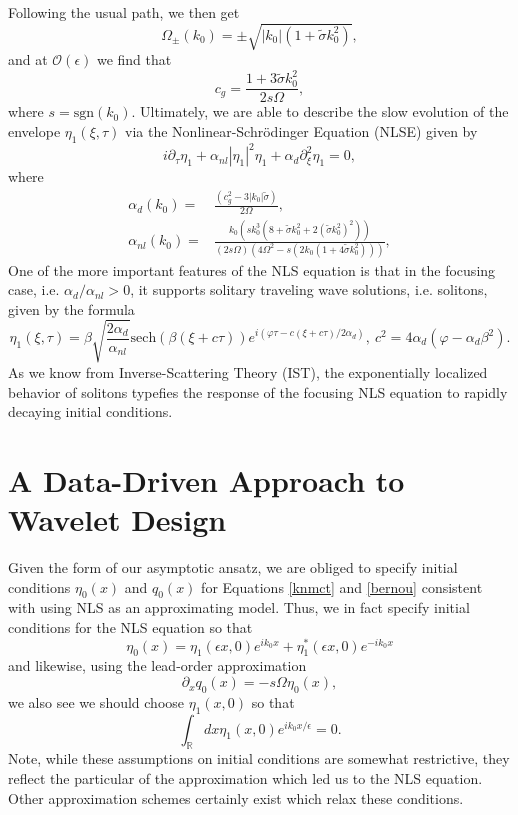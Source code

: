 \documentclass[a4paper,11pt]{article}
\newcommand{\p}{\partial}
\newcommand{\sech}{\mbox{sech}}
\begin{document}
Following the usual path, we then get 
\begin{equation*}
\Omega_{\pm}(k_{0})  = \pm \sqrt{|k_{0}|(1+\tilde{\sigma}k_{0}^{2})},
\end{equation*}
and at $\mathcal{O}(\epsilon)$ we find that
\[
c_{g} = \frac{1+3\tilde{\sigma}k_{0}^{2}}{2s\Omega},
\]
where $s=\mbox{sgn}(k_{0})$.  Ultimately, we are able to describe the slow evolution of the envelope $\eta_{1}(\xi,\tau)$ via the Nonlinear-Schr\"{o}dinger Equation (NLSE) given by 
\begin{equation*}
i\p_{\tau}\eta_{1} + \alpha_{nl}\left|\eta_{1}\right|^{2}\eta_{1} + \alpha_{d}\p_{\xi}^{2}\eta_{1} = 0,
\end{equation*}
where
\begin{align*}
\alpha_{d}(k_{0}) = & \frac{(c^2_{g} - 3|k_{0}|\tilde{\sigma})}{2\Omega},\\
\alpha_{nl}(k_{0}) = & \frac{k_{0}\left( sk_{0}^{3}\left(8 + \tilde{\sigma}k_{0}^{2} + 2(\tilde{\sigma}k_{0}^{2})^{2}\right)  \right)}{\left(2s\Omega \right) \left(4\Omega^2-s(2k_{0}(1+4\tilde{\sigma}k_{0}^{2}) )\right)},
\end{align*}
One of the more important features of the NLS equation is that in the focusing case, i.e. $\alpha_{d}/\alpha_{nl}>0$, it supports solitary traveling wave solutions, i.e. solitons, given by the formula
\[
\eta_{1}(\xi,\tau) = \beta \sqrt{\frac{2\alpha_{d}}{\alpha_{nl}}}\sech\left(\beta\left(\xi + c\tau \right)\right) e^{i\left(\varphi \tau - c(\xi+c\tau)/2\alpha_{d}\right)}, ~ c^{2} = 4\alpha_{d}(\varphi - \alpha_{d}\beta^{2}).
\]
As we know from Inverse-Scattering Theory (IST), the exponentially localized behavior of solitons typefies the response of the focusing NLS equation to rapidly decaying initial conditions. 

\section*{A Data-Driven Approach to Wavelet Design}

Given the form of our asymptotic ansatz, we are obliged to specify initial conditions $\eta_{0}(x)$ and $q_{0}(x)$ for Equations \eqref{knmct} and \eqref{bernou} consistent with using NLS as an approximating model.  Thus, we in fact specify initial conditions for the NLS equation so that 
\[
\eta_{0}(x) = \eta_{1}(\epsilon x,0)e^{ik_{0}x} +  \eta_{1}^{\ast}(\epsilon x,0)e^{-ik_{0}x}
\]
and likewise, using the lead-order approximation
\[
\p_{x}q_{0}(x) = -s\Omega \eta_{0}(x),
\]
we also see we should choose $\eta_{1}(x,0)$ so that 
\[
\int_{\mathbb{R}}dx \eta_{1}(x,0)e^{ik_{0}x/\epsilon} = 0.
\]
Note, while these assumptions on initial conditions are somewhat restrictive, they reflect the particular of the approximation which led us to the NLS equation.  Other approximation schemes certainly exist which relax these conditions.  
\end{document}
